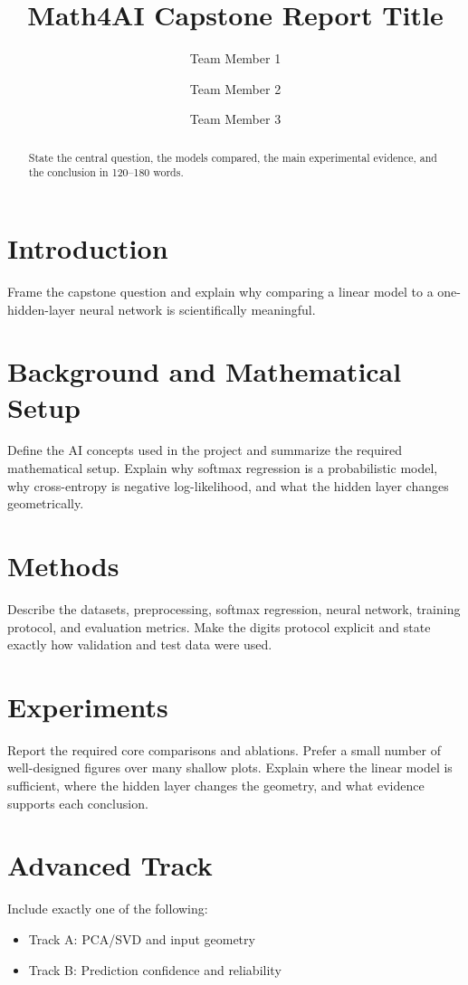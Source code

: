 \documentclass[11pt]{article}
\title{Math4AI Capstone Report Title}
\author{Team Member 1 \and Team Member 2 \and Team Member 3}
\date{}
\begin{document}
\maketitle

\begin{abstract}
State the central question, the models compared, the main experimental evidence, and the conclusion in 120--180 words.
\end{abstract}

\section{Introduction}
Frame the capstone question and explain why comparing a linear model to a one-hidden-layer neural network is scientifically meaningful.

\section{Background and Mathematical Setup}
Define the AI concepts used in the project and summarize the required mathematical setup. Explain why softmax regression is a probabilistic model, why cross-entropy is negative log-likelihood, and what the hidden layer changes geometrically.

\section{Methods}
Describe the datasets, preprocessing, softmax regression, neural network, training protocol, and evaluation metrics. Make the digits protocol explicit and state exactly how validation and test data were used.

\section{Experiments}
Report the required core comparisons and ablations. Prefer a small number of well-designed figures over many shallow plots. Explain where the linear model is sufficient, where the hidden layer changes the geometry, and what evidence supports each conclusion.

\section{Advanced Track}
Include exactly one of the following:
\begin{itemize}[leftmargin=1.4em]
    \item Track A: PCA/SVD and input geometry
    \item Track B: Prediction confidence and reliability
\end{itemize}
\end{document}

